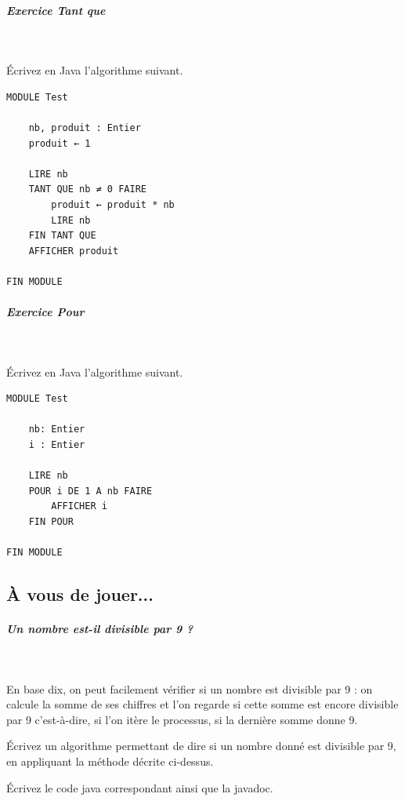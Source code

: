 \documentclass[11pt,a4paper]{article}
\begin{document}
		\subparagraph{Exercice Tant que} 
		
					\textcolor{white}{.} \par
				
					\'Ecrivez en Java l'algorithme suivant.
				
            \par
        \begin{verbatim}
MODULE Test

    nb, produit : Entier
    produit ← 1 

    LIRE nb
    TANT QUE nb ≠ 0 FAIRE
        produit ← produit * nb
        LIRE nb 
    FIN TANT QUE
    AFFICHER produit
    
FIN MODULE
			    \end{verbatim}
			
		\subparagraph{Exercice Pour} 
		
					\textcolor{white}{.} \par
				
					\'Ecrivez en Java l'algorithme suivant.
				
            \par
        \begin{verbatim}
MODULE Test

    nb: Entier
    i : Entier

    LIRE nb
    POUR i DE 1 A nb FAIRE
        AFFICHER i
    FIN POUR

FIN MODULE
			     \end{verbatim}\subsection{\`A vous de jouer...}
			
		\subparagraph{Un nombre est-il divisible par 9 ?} 
		
					\textcolor{white}{.} \par
				
          En base dix, on peut facilement v\'erifier si un nombre est divisible par 9 :
          on calcule la somme de ses chiffres et l'on regarde si cette somme est encore divisible par 9
          c'est-\`a-dire, si l'on it\`ere le processus, si la derni\`ere somme donne 9. \par
				
          \'Ecrivez un algorithme permettant de dire si un nombre donn\'e est divisible par 9, en appliquant la m\'ethode d\'ecrite ci-dessus.
        
            \par
        \'Ecrivez le code java correspondant ainsi que la javadoc.
            \par
        
\end{document}
